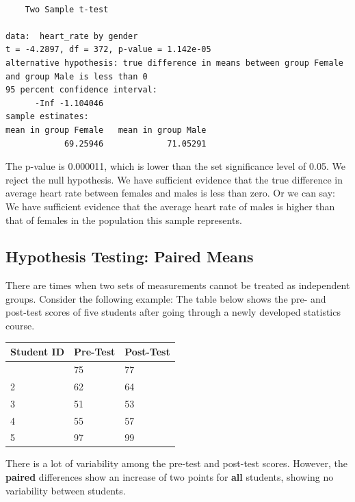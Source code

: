 \documentclass[
  letterpaper,
  DIV=11,
  numbers=noendperiod]{scrartcl}
\begin{document}
\begin{verbatim}

    Two Sample t-test

data:  heart_rate by gender
t = -4.2897, df = 372, p-value = 1.142e-05
alternative hypothesis: true difference in means between group Female and group Male is less than 0
95 percent confidence interval:
      -Inf -1.104046
sample estimates:
mean in group Female   mean in group Male 
            69.25946             71.05291 
\end{verbatim}

The p-value is 0.000011, which is lower than the set significance level
of 0.05. We reject the null hypothesis. We have sufficient evidence that
the true difference in average heart rate between females and males is
less than zero. Or we can say: We have sufficient evidence that the
average heart rate of males is higher than that of females in the
population this sample represents.

\subsection{Hypothesis Testing: Paired
Means}\label{hypothesis-testing-paired-means}

There are times when two sets of measurements cannot be treated as
independent groups. Consider the following example: The table below
shows the pre- and post-test scores of five students after going through
a newly developed statistics course.

\begin{longtable}[]{@{}lll@{}}
\toprule\noalign{}
Student ID & Pre-Test & Post-Test \\
\midrule\noalign{}
\endhead
\bottomrule\noalign{}
\endlastfoot
1 & 75 & 77 \\
2 & 62 & 64 \\
3 & 51 & 53 \\
4 & 55 & 57 \\
5 & 97 & 99 \\
\end{longtable}

\begin{tcolorbox}[enhanced jigsaw, bottomtitle=1mm, colback=white, opacityback=0, leftrule=.75mm, opacitybacktitle=0.6, coltitle=black, left=2mm, colframe=quarto-callout-note-color-frame, toptitle=1mm, colbacktitle=quarto-callout-note-color!10!white, titlerule=0mm, title=\textcolor{quarto-callout-note-color}{\faInfo}\hspace{0.5em}{Note}, arc=.35mm, rightrule=.15mm, breakable, bottomrule=.15mm, toprule=.15mm]

There is a lot of variability among the pre-test and post-test scores.
However, the \textbf{paired} differences show an increase of two points
for \textbf{all} students, showing no variability between students.

\end{tcolorbox}
\end{document}
